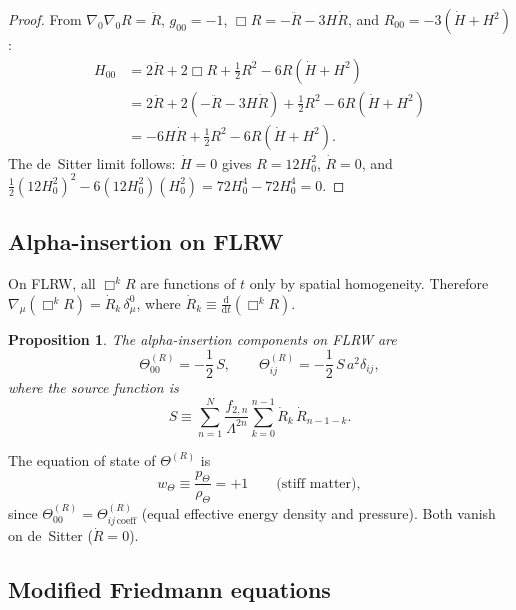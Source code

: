 \documentclass[12pt,a4paper]{article}
\newcommand{\dd}{\mathrm{d}}
\newcommand{\Lam}{\Lambda}
\theoremstyle{plain}
\newtheorem{proposition}[theorem]{Proposition}
\theoremstyle{definition}
\begin{document}
\begin{proof}
From $\nabla_0\nabla_0 R = \ddot{R}$, $g_{00} = -1$,
$\Box R = -\ddot{R} - 3H\dot{R}$, and
$R_{00} = -3(\dot{H} + H^2)$:
\begin{align*}
  H_{00} &= 2\ddot{R} + 2\Box R + \tfrac{1}{2}R^2 - 6R(\dot{H}+H^2) \\
  &= 2\ddot{R} + 2(-\ddot{R} - 3H\dot{R}) + \tfrac{1}{2}R^2
  - 6R(\dot{H}+H^2)\\
  &= -6H\dot{R} + \tfrac{1}{2}R^2 - 6R(\dot{H}+H^2).
\end{align*}
The de~Sitter limit follows: $\dot{H} = 0$ gives
$R = 12H_0^2$, $\dot{R} = 0$, and
$\frac{1}{2}(12H_0^2)^2 - 6(12H_0^2)(H_0^2)
= 72H_0^4 - 72H_0^4 = 0$.
\end{proof}

\subsection{Alpha-insertion on FLRW}

On FLRW, all $\Box^k R$ are functions of $t$ only by spatial homogeneity.
Therefore $\nabla_\mu(\Box^k R) = \dot{R}_k\,\delta^0_\mu$, where
$\dot{R}_k \equiv \frac{\dd}{\dd t}(\Box^k R)$.

\begin{proposition}
\label{prop:theta-FLRW}
The alpha-insertion components on FLRW are
\begin{equation}\label{eq:theta-FLRW}
  \Theta^{(R)}_{00} = -\frac{1}{2}\,S,
  \qquad
  \Theta^{(R)}_{ij} = -\frac{1}{2}\,S\,a^2\delta_{ij},
\end{equation}
where the source function is
\begin{equation}\label{eq:S-source}
  S \equiv \sum_{n=1}^{N} \frac{f_{2,n}}{\Lam^{2n}}
  \sum_{k=0}^{n-1} \dot{R}_k\,\dot{R}_{n-1-k}.
\end{equation}
\end{proposition}

\noindent
The equation of state of $\Theta^{(R)}$ is
\begin{equation}\label{eq:eos-theta}
  w_\Theta \equiv \frac{p_\Theta}{\rho_\Theta} = +1
  \qquad\text{(stiff matter)},
\end{equation}
since $\Theta^{(R)}_{00} = \Theta^{(R)}_{ij\,\mathrm{coeff}}$ (equal
effective energy density and pressure).  Both vanish on de~Sitter
($\dot{R} = 0$).

\subsection{Modified Friedmann equations}
\end{document}

